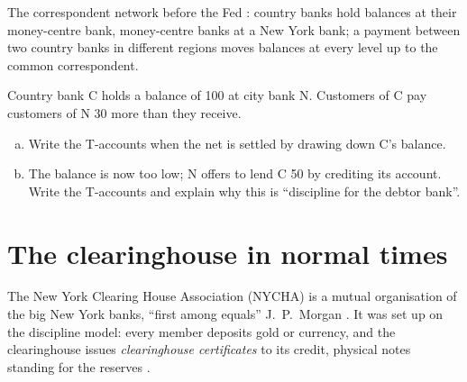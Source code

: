 \begin{paracol}{2}
\begin{nfigure}
\caption{The correspondent network before the Fed : country banks hold balances at their money-centre bank, money-centre
banks at a New York bank; a payment between two country banks in different regions moves balances at every level up to the common correspondent.}
\label{fig:ch-network}
\end{nfigure}

\begin{exercise}
Country bank C holds a balance of 100 at city bank N. Customers of C pay customers of N 30 more than they receive.
\begin{enumerate}[(a)]
  \item Write the T-accounts when the net is settled by drawing down C's balance.
  \item The balance is now too low; N offers to lend C 50 by crediting its account. Write the T-accounts and explain why this is ``discipline for the debtor
        bank''.
\end{enumerate}
\end{exercise}

\section{The clearinghouse in normal times}\label{sec:ch-chouse}

The New York Clearing House Association (NYCHA) is a mutual organisation of the big New York banks, ``first among equals'' J.~P.~Morgan
. It was set up on the discipline model: every member deposits gold or currency, and the clearinghouse issues
\emph{clearinghouse certificates} to its credit, physical notes standing for the reserves .
\begin{taccts}
\end{taccts}


\end{paracol}
